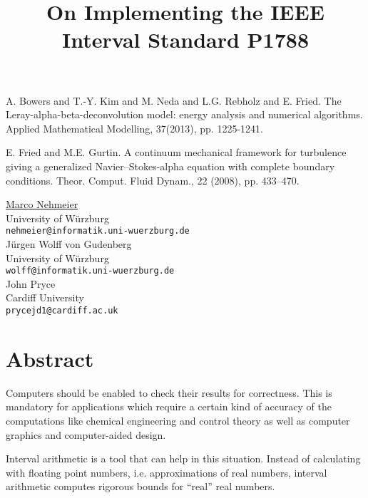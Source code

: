 \documentclass[article,A4,11pt]{llncs}%
\begin{document}

\begin{thebibliography}{10}
{\sc A. Bowers and T.-Y. Kim and M. Neda and L.G. Rebholz and E. Fried}. {The Leray-alpha-beta-deconvolution model: energy analysis and numerical algorithms}. Applied Mathematical Modelling, 37(2013), pp. 1225-1241.

{\sc E. Fried and M.E. Gurtin}. {A continuum mechanical framework for turbulence giving a generalized Navier–Stokes-alpha equation with complete boundary conditions}. Theor. Comput. Fluid Dynam., 22 (2008), pp. 433–470.
\end{thebibliography}

\title{On Implementing  the IEEE Interval Standard P1788}
 \author{} \institute{}
\maketitle
\begin{center}
{\large \underline{Marco Nehmeier}}\\
University of W\"urzburg\\
{\tt nehmeier@informatik.uni-wuerzburg.de}
\\ \vspace{4mm}
{\large J\"urgen Wolff von Gudenberg}\\
University of W\"urzburg\\
{\tt wolff@informatik.uni-wuerzburg.de}
\\ \vspace{4mm}
{\large John Pryce}\\
Cardiff University\\
{\tt prycejd1@cardiff.ac.uk}
\end{center}

\section*{Abstract}
Computers should be enabled 
to check their results for correctness. 
This is mandatory for applications which require a certain kind of accuracy of 
the computations like chemical engineering 
and control theory  as well as computer graphics and computer-aided 
design. 
 
Interval arithmetic is a tool that can help in this situation. Instead of 
calculating with floating point numbers, i.e. approximations of real numbers, 
interval arithmetic computes rigorous bounds for ``real'' real numbers. 
\end{document}

